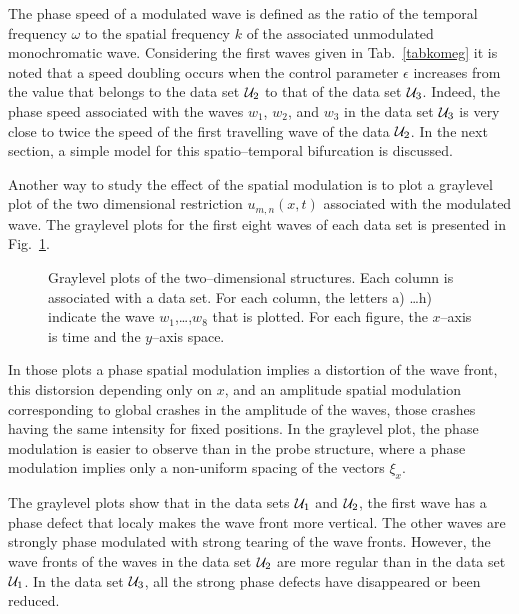 The phase speed of a modulated wave is defined as the ratio of the
temporal frequency $\omega$ to the spatial frequency $k$ of the
associated unmodulated monochromatic wave.
Considering the first waves given in Tab.~\ref{tabkomeg}
it is noted that  a speed doubling occurs when the control
parameter $\epsilon$ increases from the value that belongs to
the data set ${\cal U}_2$ to that of the data set ${\cal U}_3$.
Indeed, the phase speed associated with the waves $w_1$, $w_2$, and $w_3$
in the data set ${\cal U}_3$ is very close to twice the speed of the 
first travelling wave of the data ${\cal U}_2$. 
In the next section,
a simple model for this spatio--temporal bifurcation is discussed.


 Another way to study the effect of the spatial modulation is to plot
a graylevel plot of the two dimensional restriction $u_{m,n}(x,t)$ 
associated with the modulated wave. The graylevel plots for the 
first eight waves of each data set is presented in 
Fig.~\ref{2Dgraytot}.


\begin{figure}
\centering
{}
\caption{Graylevel plots of the two--dimensional structures. 
Each column is associated with a data set. For each column, the letters a)
\dots h) indicate the wave $w_1$,\dots,$w_8$ that is plotted. For each 
figure, the $x$--axis is time and the $y$--axis space.}
\label{2Dgraytot}
\end{figure}



In those plots a phase spatial modulation implies a distortion 
of the wave front, this distorsion depending only on $x$, 
and an amplitude spatial modulation corresponding to global crashes 
in the amplitude of the waves, those crashes having the same intensity 
for fixed positions. In the graylevel plot, the phase modulation 
is easier to observe than in the probe structure, where a phase 
modulation implies only a non-uniform spacing of the vectors $\xi_x$.

\medskip

The graylevel plots show that in the data sets ${\cal U}_1$ and 
${\cal U}_2$, the first wave has a phase defect that localy makes
the wave front more vertical. The other waves are strongly phase 
modulated with strong tearing of the wave fronts. 
However, the wave fronts of the waves in the data set ${\cal U}_2$
are more  regular than in the data set ${\cal U}_1$. 
In the data set ${\cal U}_3$,
all the strong phase defects have disappeared or been reduced.

